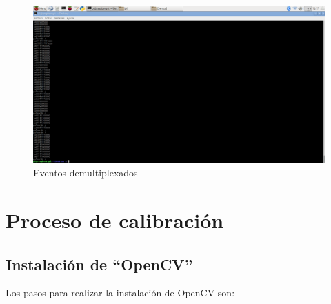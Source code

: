     \begin{figure}[p]
    \centering
    \includegraphics[scale = 0.25]{capitulo_04/figuras_dir/demu.jpg}
    \caption{Eventos demultiplexados}
    \label{fig: Eventos demultiplexados}
    \end{figure}
\clearpage

\section{Proceso de calibración} \label{s4_2}

\subsection{Instalación de ``OpenCV''} \label{s4_2_1}

Los pasos para realizar la instalación de OpenCV \citep{codebind} son:

